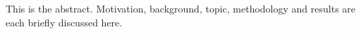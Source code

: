 This is the abstract. Motivation, background, topic, methodology and results are each briefly discussed here.